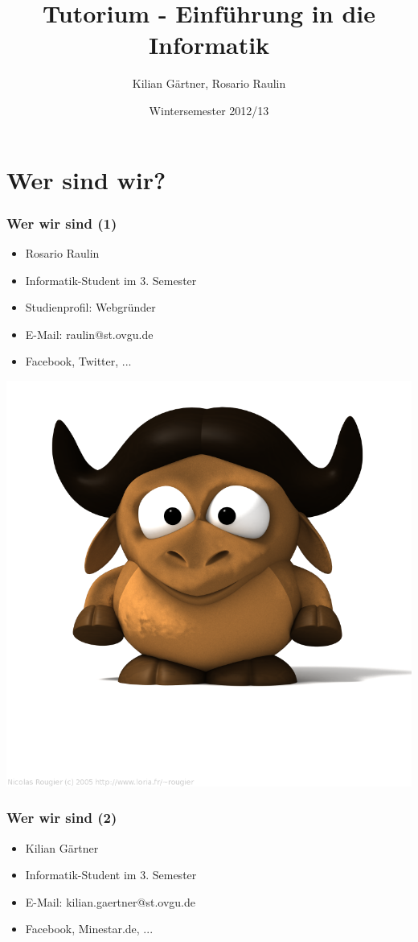 \documentclass[12pt]{beamer}
\title{Tutorium - Einführung in die Informatik}
\author{Kilian Gärtner, Rosario Raulin}
\date{Wintersemester 2012/13}
\begin{document}
\frame{\titlepage}

\section{Wer sind wir?}

\begin{frame}

	\frametitle{Wer wir sind (1)}

	\begin{itemize}
		\item Rosario Raulin
		\item Informatik-Student im 3. Semester
		\item Studienprofil: Webgründer
		\item E-Mail: raulin@st.ovgu.de
		\item Facebook, Twitter, ...
	\end{itemize}

	\begin{flushright}
		\includegraphics[scale=0.1]{src/img/babygnu}
	\end{flushright}

\end{frame}

\begin{frame}

	\frametitle{Wer wir sind (2)}

	\begin{itemize}
		\item Kilian Gärtner
		\item Informatik-Student im 3. Semester
		\item E-Mail: kilian.gaertner@st.ovgu.de
		\item Facebook, Minestar.de, ...
	\end{itemize}

\end{frame}
\end{document}
